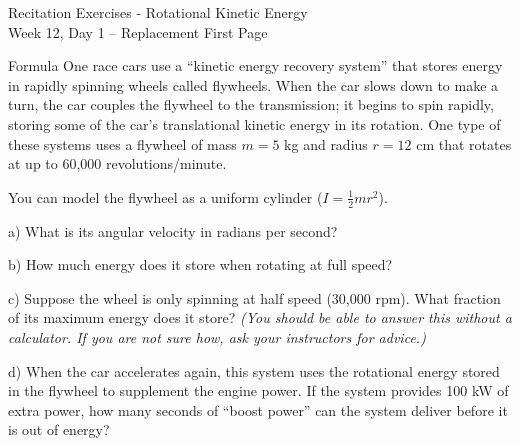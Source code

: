 \documentclass[12pt]{article}
\begin{document}
\Large
\begin{center}
	Recitation Exercises - Rotational Kinetic Energy \\
	Week 12, Day 1 -- Replacement First Page
\end{center}
\normalsize




Formula One race cars use a ``kinetic energy recovery system'' that stores energy in rapidly spinning wheels called flywheels. When the car slows down to make a turn, the car couples the flywheel to the transmission; it begins to spin rapidly, storing some of the car's translational kinetic energy in its rotation. One type of these systems uses a flywheel of mass $m=5$ kg and radius $r=12$ cm that rotates at up to 60,000 revolutions/minute.

You can model the flywheel as a uniform cylinder ($I=\frac{1}{2}mr^2$).


a) What is its angular velocity in radians per second?

\vspace{2in}

b) How much energy does it store when rotating at full speed?

\vspace{2in}

c) Suppose the wheel is only spinning at half speed (30,000 rpm). What fraction of its maximum energy does it store? \textit{(You should be able to answer this without a calculator. If you are not sure how, ask your instructors for advice.)}

\vspace{0.5in}

d) When the car accelerates again, this system uses the rotational energy stored in the flywheel to supplement the engine power. If the system provides 100 kW of extra power, how many seconds of ``boost power'' can the system deliver before it is out of energy?
\end{document}
